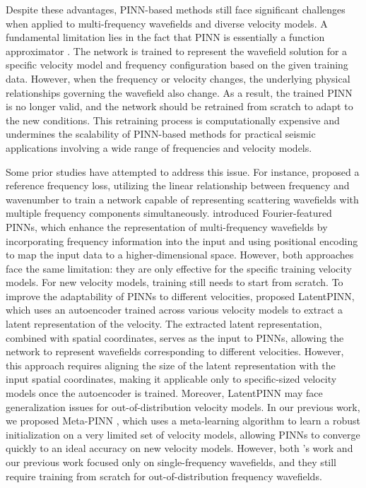Despite these advantages, PINN-based methods still face significant challenges when applied to multi-frequency wavefields and diverse velocity models. A fundamental limitation lies in the fact that PINN is essentially a function approximator \citep{huang2022meta}. The network is trained to represent the wavefield solution for a specific velocity model and frequency configuration based on the given training data. However, when the frequency or velocity changes, the underlying physical relationships governing the wavefield also change. As a result, the trained PINN is no longer valid, and the network should be retrained from scratch to adapt to the new conditions. This retraining process is computationally expensive and undermines the scalability of PINN-based methods for practical seismic applications involving a wide range of frequencies and velocity models. 

Some prior studies have attempted to address this issue. For instance, \cite{huang2022single} proposed a reference frequency loss, utilizing the linear relationship between frequency and wavenumber to train a network capable of representing scattering wavefields with multiple frequency components simultaneously. \cite{song2023simulating} introduced Fourier-featured PINNs, which enhance the representation of multi-frequency wavefields by incorporating frequency information into the input and using positional encoding to map the input data to a higher-dimensional space. However, both approaches face the same limitation: they are only effective for the specific training velocity models. For new velocity models, training still needs to start from scratch. To improve the adaptability of PINNs to different velocities, \cite{taufik2024multiple} proposed LatentPINN, which uses an autoencoder trained across various velocity models to extract a latent representation of the velocity. The extracted latent representation, combined with spatial coordinates, serves as the input to PINNs, allowing the network to represent wavefields corresponding to different velocities. However, this approach requires aligning the size of the latent representation with the input spatial coordinates, making it applicable only to specific-sized velocity models once the autoencoder is trained. Moreover, LatentPINN may face generalization issues for out-of-distribution velocity models. In our previous work, we proposed Meta-PINN \citep{cheng2025meta}, which uses a meta-learning algorithm \citep{finn2017model} to learn a robust initialization on a very limited set of velocity models, allowing PINNs to converge quickly to an ideal accuracy on new velocity models. However, both \cite{taufik2024multiple}'s work and our previous work focused only on single-frequency wavefields, and they still require training from scratch for out-of-distribution frequency wavefields. 

